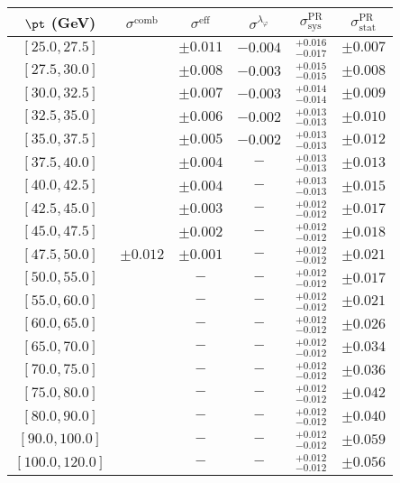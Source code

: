 \begin{tabular}{c||c|c|c||c|c}
$\pt$ (GeV) & $\sigma^{\text{comb}}$ & $\sigma^{\text{eff}}$ & $\sigma^{\lambda_\varphi}$ & $\sigma_{\text{sys}}^{\text{PR}}$ & $\sigma_{\text{stat}}^{\text{PR}}$ \\
\hline
$[25.0, 27.5]$ & \multirow{19}{*}{$\pm0.012$} & $\pm0.011$ & $-0.004$ & $^{+0.016}_{-0.017}$ & $\pm0.007$\\
$[27.5, 30.0]$ &  & $\pm0.008$ & $-0.003$ & $^{+0.015}_{-0.015}$ & $\pm0.008$\\
$[30.0, 32.5]$ &  & $\pm0.007$ & $-0.003$ & $^{+0.014}_{-0.014}$ & $\pm0.009$\\
$[32.5, 35.0]$ &  & $\pm0.006$ & $-0.002$ & $^{+0.013}_{-0.013}$ & $\pm0.010$\\
$[35.0, 37.5]$ &  & $\pm0.005$ & $-0.002$ & $^{+0.013}_{-0.013}$ & $\pm0.012$\\
$[37.5, 40.0]$ &  & $\pm0.004$ & $-$ & $^{+0.013}_{-0.013}$ & $\pm0.013$\\
$[40.0, 42.5]$ &  & $\pm0.004$ & $-$ & $^{+0.013}_{-0.013}$ & $\pm0.015$\\
$[42.5, 45.0]$ &  & $\pm0.003$ & $-$ & $^{+0.012}_{-0.012}$ & $\pm0.017$\\
$[45.0, 47.5]$ &  & $\pm0.002$ & $-$ & $^{+0.012}_{-0.012}$ & $\pm0.018$\\
$[47.5, 50.0]$ &  & $\pm0.001$ & $-$ & $^{+0.012}_{-0.012}$ & $\pm0.021$\\
$[50.0, 55.0]$ &  & $-$ & $-$ & $^{+0.012}_{-0.012}$ & $\pm0.017$\\
$[55.0, 60.0]$ &  & $-$ & $-$ & $^{+0.012}_{-0.012}$ & $\pm0.021$\\
$[60.0, 65.0]$ &  & $-$ & $-$ & $^{+0.012}_{-0.012}$ & $\pm0.026$\\
$[65.0, 70.0]$ &  & $-$ & $-$ & $^{+0.012}_{-0.012}$ & $\pm0.034$\\
$[70.0, 75.0]$ &  & $-$ & $-$ & $^{+0.012}_{-0.012}$ & $\pm0.036$\\
$[75.0, 80.0]$ &  & $-$ & $-$ & $^{+0.012}_{-0.012}$ & $\pm0.042$\\
$[80.0, 90.0]$ &  & $-$ & $-$ & $^{+0.012}_{-0.012}$ & $\pm0.040$\\
$[90.0, 100.0]$ &  & $-$ & $-$ & $^{+0.012}_{-0.012}$ & $\pm0.059$\\
$[100.0, 120.0]$ &  & $-$ & $-$ & $^{+0.012}_{-0.012}$ & $\pm0.056$\\
\end{tabular}
